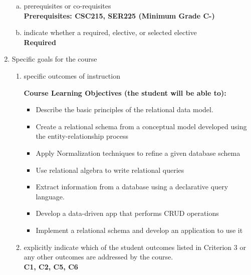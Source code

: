 \begin{enumerate}[1.]
\begin{enumerate}[a.]
\item prerequisites or co-requisites\\
  {\bfseries
    Prerequisites: CSC215, SER225 (Minimum Grade C-) \\  %
  }

\item indicate whether a required, elective, or selected elective\\ %
  {\bfseries
    Required
  }

\end{enumerate}

\item Specific goals for the course
\begin{enumerate}
\item specific outcomes of instruction\\ %
  {\bfseries
    Course Learning Objectives (the student will be able to):
    \begin{itemize}
      \item Describe the basic principles of the relational data model.
      \item Create a relational schema from a conceptual model developed using the entity-relationship
process
      \item Apply Normalization techniques to refine a given database schema
      \item Use relational algebra to write relational queries
      \item Extract information from a database using a declarative query language.
      \item Develop a data-driven app that performs CRUD operations
      \item Implement a relational schema and develop an application to use it
    \end{itemize}
  }

\item explicitly indicate which of the student outcomes listed in Criterion 3 or any other outcomes are addressed by the course.\\
  {\bfseries
    C1,
    C2,
    C5,
    C6
  }
\end{enumerate}


\end{enumerate}
